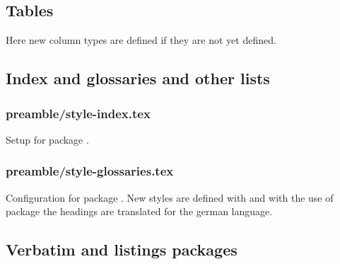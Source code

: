\subsection{Tables}

Here new column types are defined if they are not yet defined.


\subsection{Index and glossaries and other lists}


\subsubsection{preamble/style-index.tex}

Setup for package .


\subsubsection{preamble/style-glossaries.tex}

Configuration for package . New styles are defined with  and with the use of package  the headings are translated for the german language.


\subsection{Verbatim and listings packages}


